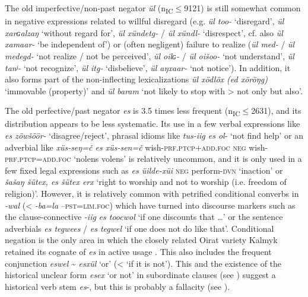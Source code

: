 \documentclass[output=paper,colorlinks,citecolor=brown,chinesefont]{langscibook}
\begin{document}
The old imperfective/non-past negator \textit{ül} (n\textsubscript{IC}${\leq}$9121) is still somewhat common in negative expressions related to willful disregard (e.g. \textit{ül too-} ‘disregard’, \textit{ül xarɢalzaŋ} ‘without regard for’, \textit{ül xündetg-} / \textit{ül xündl-} ‘disrespect’, cf. also \textit{ül xamaar-} ‘be independent of’) or (often negligent) failure to realize (\textit{ül med-} / \textit{ül medegd-} ‘not realize / not be perceived’, \textit{ül oilɢ{}-} / \textit{ül oišoo-} ‘not understand’, \textit{ül tanʲ-} ‘not recognize’, \textit{ül itg-} ‘disbelieve’, \textit{ül aŋxaar-} ‘not notice’). In addition, it also forms part of the non-inflecting lexicalizations \textit{ül xödlöx (ed xöröŋg)} ‘immovable (property)’ and \textit{ül baram} ‘not likely to stop with > not only but also’. 

The old perfective/past negator \textit{es} is 3.5 times less frequent (n\textsubscript{IC}${\leq}$2631), and its distribution appears to be less systematic. Its use in a few verbal expressions like \textit{es zöwšöör-} ‘disagree/reject’, phrasal idioms like \textit{tus-iig es ol}{}- ‘not find help’ or an adverbial like \textit{xüs-seŋ=č es xüs-sen=č}  wish-\textsc{prf.ptcp+add.foc} \textsc{neg} wish-\textsc{prf.ptcp=add.foc} ‘nolens volens’ is relatively uncommon, and it is only used in a few fixed legal expressions such as \textit{es üilde-xüi} \textsc{neg} perform-\textsc{dvn} ‘inaction’ or \textit{šašaŋ šütex, es šütex erx} ‘right to worship and not to worship (i.e. freedom of religion)’. However, it is relatively common with petrified conditional converbs in \textit{-wal} (< \textit{-ba=la} –\textsc{pst=lim.foc}) which have turned into discourse markers such as the clause-connective \textit{-iig} \textit{es toocwol} ‘if one discounts that …’ or the sentence adverbials \textit{es tegwees} / \textit{es tegwel} ‘if one does not do like that’. Conditional negation is the only area in which the closely related Oirat variety Kalmyk retained its cognate of \textit{es} in active usage \citep[27--31]{Baranova2019}. This also includes the frequent conjunction \textit{eswel} {\textasciitilde} \textit{esxül} ‘or’ (< ‘if it is not’). This and the existence of the historical unclear form \textit{esex} ‘or not’ in subordinate clauses (see ) suggest a historical verb stem \textit{es}{}-, but this is probably a fallacity (see \citealt[89--90]{Brosig2015Negation}).
\end{document}
